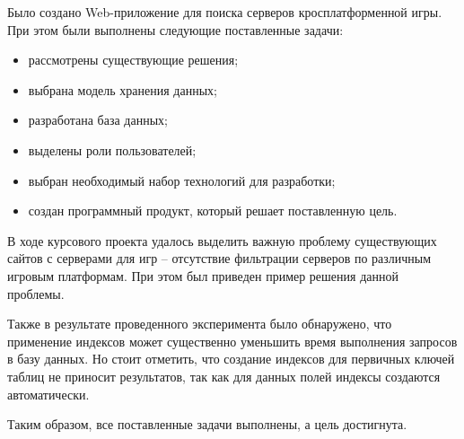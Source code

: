 \conclusion

Было создано Web-приложение для поиска серверов кросплатформенной игры. При этом были выполнены следующие поставленные задачи:

\begin{itemize}
	\item рассмотрены существующие решения;
	\item выбрана модель хранения данных;
	\item разработана база данных;
	\item выделены роли пользователей;
	\item выбран необходимый набор технологий для разработки;
	\item создан программный продукт, который решает поставленную цель.
\end{itemize}

В ходе курсового проекта удалось выделить важную проблему существующих сайтов с серверами для игр -- отсутствие фильтрации серверов по различным игровым платформам. При этом был приведен пример решения данной проблемы.

Также в результате проведенного эксперимента было обнаружено, что применение индексов может существенно уменьшить время выполнения запросов в базу данных. Но стоит отметить, что создание индексов для первичных ключей таблиц не приносит результатов, так как для данных полей индексы создаются автоматически.

Таким образом, все поставленные задачи выполнены, а цель достигнута.

